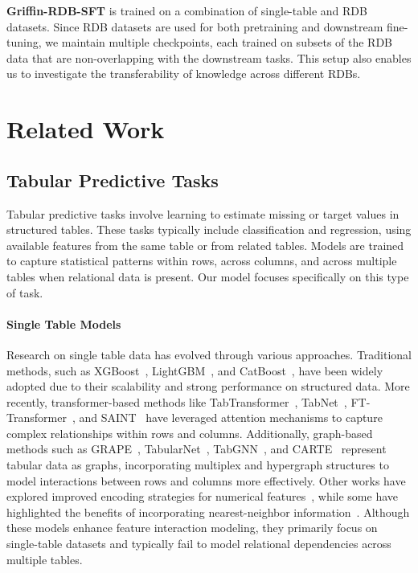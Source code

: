 \documentclass{article}
\theoremstyle{plain}
\theoremstyle{definition}
\theoremstyle{remark}
\begin{document}
\textbf{Griffin-RDB-SFT} is trained on a combination of single-table and RDB datasets. Since RDB datasets are used for both pretraining and downstream fine-tuning, we maintain multiple checkpoints, each trained on subsets of the RDB data that are non-overlapping with the downstream tasks. This setup also enables us to investigate the transferability of knowledge across different RDBs.

\section{Related Work}
\subsection{Tabular Predictive Tasks}
Tabular predictive tasks involve learning to estimate missing or target values in structured tables. These tasks typically include classification and regression, using available features from the same table or from related tables. Models are trained to capture statistical patterns within rows, across columns, and across multiple tables when relational data is present. Our model focuses specifically on this type of task.

\vspace*{-0.2cm}
\paragraph{Single Table Models}
Research on single table data has evolved through various approaches. Traditional methods, such as XGBoost~\citep{chen2016xgboost}, LightGBM~\citep{ke2017lightgbm}, and CatBoost~\citep{prokhorenkova2018catboost}, have been widely adopted due to their scalability and strong performance on structured data. More recently, transformer-based methods like TabTransformer~\citep{huang2020tabtransformer}, TabNet~\citep{arik2021tabnet}, FT-Transformer~\citep{gorishniy2021revisiting}, and SAINT~\citep{somepalli2021saint} have leveraged attention mechanisms to capture complex relationships within rows and columns.
Additionally, graph-based methods such as GRAPE~\citep{you2020handling}, TabularNet~\citep{du2021tabularnet}, TabGNN~\citep{guo2021tabgnn}, and CARTE~\cite{kim2024carte} represent tabular data as graphs, incorporating multiplex and hypergraph structures to model interactions between rows and columns more effectively. Other works have explored improved encoding strategies for numerical features~\citep{gorishniy2022embeddings, yarullin2023numerical}, while some have highlighted the benefits of incorporating nearest-neighbor information~\citep{gorishniy2023tabr, ye2025revisiting}. Although these models enhance feature interaction modeling, they primarily focus on single-table datasets and typically fail to model relational dependencies across multiple tables.
\end{document}
